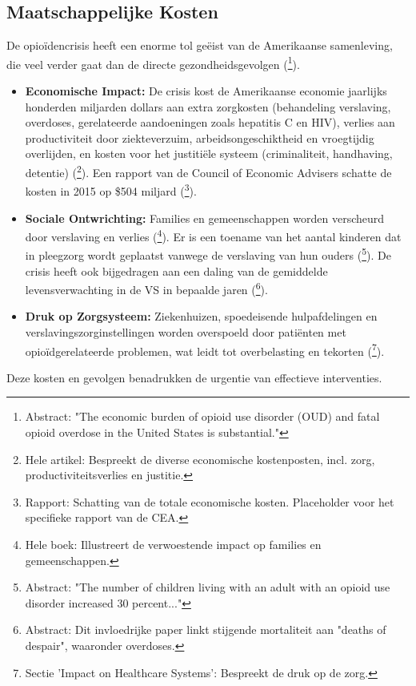 \documentclass[11pt, a4paper]{report} %
\begin{document}
\subsection{Maatschappelijke Kosten}
De opioïdencrisis heeft een enorme tol geëist van de Amerikaanse samenleving, die veel verder gaat dan de directe gezondheidsgevolgen (\cite{Florence2020EconomicBurdenOUD}\footnote{Abstract: "The economic burden of opioid use disorder (OUD) and fatal opioid overdose in the United States is substantial."}).
\begin{itemize}
    \item \textbf{Economische Impact:} De crisis kost de Amerikaanse economie jaarlijks honderden miljarden dollars aan extra zorgkosten (behandeling verslaving, overdoses, gerelateerde aandoeningen zoals hepatitis C en HIV), verlies aan productiviteit door ziekteverzuim, arbeidsongeschiktheid en vroegtijdig overlijden, en kosten voor het justitiële systeem (criminaliteit, handhaving, detentie) (\cite{Brookings2017EconomicImpact}\footnote{Hele artikel: Bespreekt de diverse economische kostenposten, incl. zorg, productiviteitsverlies en justitie.}). Een rapport van de Council of Economic Advisers schatte de kosten in 2015 op \$504 miljard (\cite{WhiteHouseCEA2017CostOpioidCrisis}\footnote{Rapport: Schatting van de totale economische kosten. Placeholder voor het specifieke rapport van de CEA.}).
    \item \textbf{Sociale Ontwrichting:} Families en gemeenschappen worden verscheurd door verslaving en verlies (\cite{Macy2018Dopesick}\footnote{Hele boek: Illustreert de verwoestende impact op families en gemeenschappen.}). Er is een toename van het aantal kinderen dat in pleegzorg wordt geplaatst vanwege de verslaving van hun ouders (\cite{BullingerWing2019ChildrenLivingWithOUDAdults}\footnote{Abstract: "The number of children living with an adult with an opioid use disorder increased 30 percent..."}). De crisis heeft ook bijgedragen aan een daling van de gemiddelde levensverwachting in de VS in bepaalde jaren (\cite{CaseDeaton2015RisingMorbidityMortality}\footnote{Abstract: Dit invloedrijke paper linkt stijgende mortaliteit aan "deaths of despair", waaronder overdoses.}).
    \item \textbf{Druk op Zorgsysteem:} Ziekenhuizen, spoedeisende hulpafdelingen en verslavingszorginstellingen worden overspoeld door patiënten met opioïdgerelateerde problemen, wat leidt tot overbelasting en tekorten (\cite{Schuler2020StateScienceOpioidPolicy}\footnote{Sectie 'Impact on Healthcare Systems': Bespreekt de druk op de zorg.}).
\end{itemize}
Deze kosten en gevolgen benadrukken de urgentie van effectieve interventies.
\end{document}
